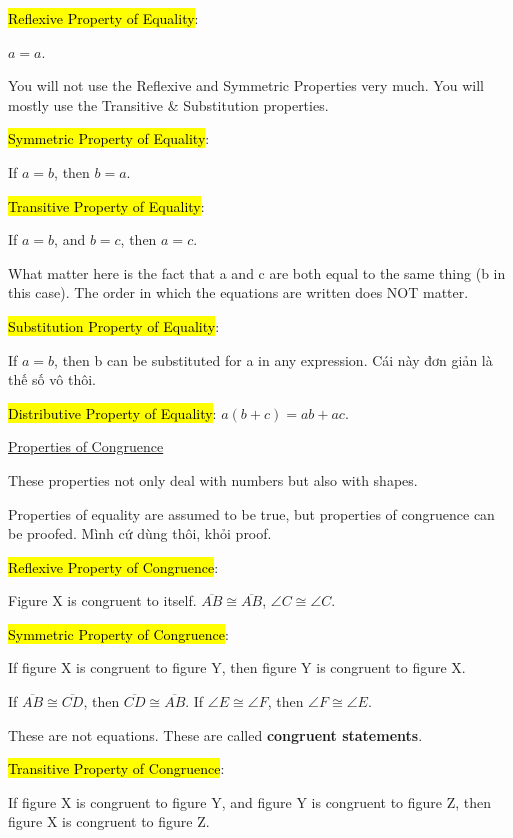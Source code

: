 \hl{Reflexive Property of Equality}:

$a=a$.

You will not use the Reflexive and Symmetric Properties very much. You will mostly use the Transitive \& Substitution properties.

\hl{Symmetric Property of Equality}:

If $a=b$, then $b=a$.

\hl{Transitive Property of Equality}:

If $a=b$, and $b=c$, then $a=c$.

What matter here is the fact that a and c are both equal to the same thing (b in this case). The order in which the equations are written does NOT matter.

\hl{Substitution Property of Equality}:

If $a=b$, then b can be substituted for a in any expression. Cái này đơn giản là thế số vô thôi.

\hl{Distributive Property of Equality}: $a(b+c)=ab+ac$.

\vspace{0.5 cm}

\centerline{\underline{\LARGE Properties of Congruence}}

\vspace{0.5cm}

These properties not only deal with numbers but also with shapes.

Properties of equality are assumed to be true, but properties of congruence can be proofed. Mình cứ dùng thôi, khỏi proof.

\vspace{.3cm}

\hl{Reflexive Property of Congruence}:

Figure X is congruent to itself. $\overline{AB} \cong \overline{AB}$, $\angle C \cong \angle C$.

\hl{Symmetric Property of Congruence}:

If figure X is congruent to figure Y, then figure Y is congruent to figure X.

If $\overline{AB} \cong \overline{CD}$, then $\overline{CD} \cong \overline{AB}$. If $\angle E \cong \angle F$, then $\angle F \cong \angle E$.

These are not equations. These are called \textbf{congruent statements}.

\hl{Transitive Property of Congruence}:

If figure X is congruent to figure Y, and figure Y is congruent to figure Z, then figure X is congruent to figure Z.


